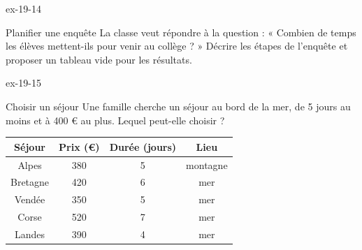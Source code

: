 \begin{blocLivre}{ex-19-14}\begin{exercice}[3]{Planifier une enquête}
La classe veut répondre à la question : « Combien de temps les élèves mettent-ils pour venir au collège ? » Décrire les étapes de l’enquête et proposer un tableau vide pour les résultats.
\end{exercice}\end{blocLivre}
\begin{blocLivre}{ex-19-15}\begin{exercice}[3]{Choisir un séjour}
Une famille cherche un séjour au bord de la mer, de 5 jours au moins et à 400 € au plus. Lequel peut-elle choisir ?\begin{center}\renewcommand{\arraystretch}{1.35}\begin{tabular}{c|ccc}\toprule
Séjour & Prix (€) & Durée (jours) & Lieu\\\midrule
Alpes & 380 & 5 & montagne\\
Bretagne & 420 & 6 & mer\\
Vendée & 350 & 5 & mer\\
Corse & 520 & 7 & mer\\
Landes & 390 & 4 & mer\\
\bottomrule\end{tabular}\end{center}
\end{exercice}\end{blocLivre}

\clearpage
